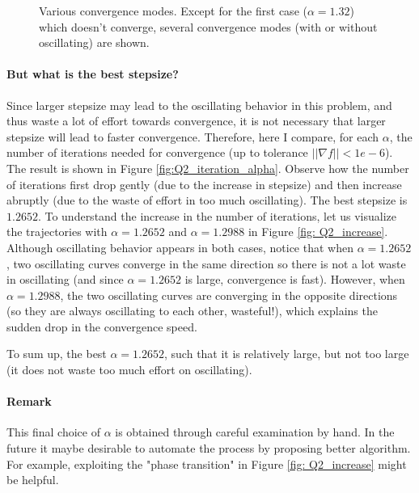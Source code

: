 \documentclass{article}
\begin{document}
\begin{figure}[htp]
	\caption{Various convergence modes. Except for the first case ($ \alpha=1.32 $) which doesn't converge, several convergence modes (with or without oscillating) are shown.}
	\label{fig: Q2_various}
	
\end{figure}

\paragraph{But what is the best stepsize?} Since larger stepsize may lead to the oscillating behavior in this problem, and thus waste a lot of effort towards convergence, it is not necessary that larger stepsize will lead to faster convergence. Therefore, here I compare, for each $ \alpha $, the number of iterations needed for convergence (up to tolerance $ ||\nabla f||<1e-6 $). The result is shown in Figure \ref{fig:Q2_iteration_alpha}. Observe how the number of iterations first drop gently (due to the increase in stepsize) and then increase abruptly (due to the waste of effort in too much oscillating). The best stepsize is $ 1.2652 $. To understand the increase in the number of iterations, let us visualize the trajectories with $ \alpha = 1.2652 $ and $ \alpha = 1.2988 $ in Figure \ref{fig: Q2_increase}. Although oscillating behavior appears in both cases, notice that when $ \alpha = 1.2652 $, two oscillating curves converge in the same direction so there is not a lot waste in oscillating (and since $ \alpha = 1.2652 $ is large, convergence is fast). However, when $ \alpha = 1.2988 $, the two oscillating curves are converging in the opposite directions (so they are always oscillating to each other, wasteful!), which explains the sudden drop in the convergence speed.

To sum up, the best $ \alpha = 1.2652 $, such that it is relatively large, but not too large (it does not waste too much effort on oscillating).

\paragraph{Remark} This final choice of $ \alpha $ is obtained through careful examination by hand. In the future it maybe desirable to automate the process by proposing better algorithm. For example, exploiting the "phase transition" in Figure \ref{fig: Q2_increase} might be helpful.
\end{document}
